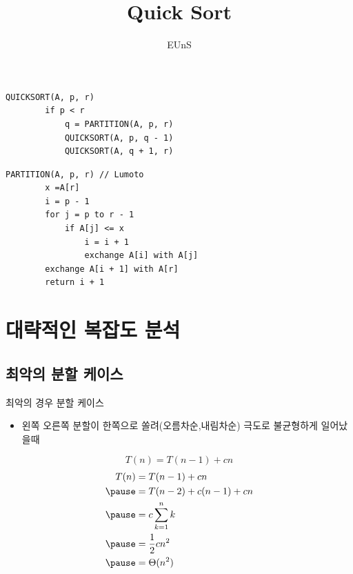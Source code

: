 \documentclass[10pt]{beamer}
\title{Quick Sort}
\author{EUnS}
\begin{document}
\begin{frame}{}
    \maketitle
\end{frame}    



\begin{frame}[fragile]{}
    \begin{lstlisting}[style = Cstyle]
    QUICKSORT(A, p, r)
        if p < r
            q = PARTITION(A, p, r)
            QUICKSORT(A, p, q - 1)
            QUICKSORT(A, q + 1, r)
    \end{lstlisting}
    \pause
    \begin{lstlisting}[style = Cstyle]
    PARTITION(A, p, r) // Lumoto
        x =A[r]
        i = p - 1
        for j = p to r - 1
            if A[j] <= x
                i = i + 1
                exchange A[i] with A[j]
        exchange A[i + 1] with A[r]
        return i + 1
    \end{lstlisting}
\end{frame}    


\section{대략적인 복잡도 분석}

\subsection{최악의 분할 케이스} 

\begin{frame}{최악의 경우 분할 케이스}
    \pause
    \begin{itemize}
        \item 왼쪽 오른쪽 분할이 한쪽으로 쏠려(오름차순,내림차순) 극도로 불균형하게 일어났을때
        \pause
    \end{itemize}
    $$T(n) = T(n-1) + cn $$
    \pause
    \[
        \begin{aligned}
            T(n) &= T(n-1) + cn \\ \pause
            &= T(n-2) + c(n-1) +cn \\  \pause
            &= c\sum^{n}_{k=1}k \\ \pause
            &= \dfrac{1}{2} cn^{2}\\ \pause
            &= \Theta (n^{2})    
        \end{aligned}
    \]
\end{frame}
\end{document}
